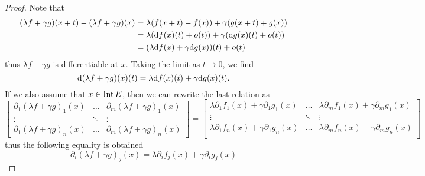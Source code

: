 \begin{proof}
  Note that
  \begin{align*}
    (\lambda f + \gamma g)(x + t) - (\lambda f + \gamma g)(x)
    &= \lambda (f(x + t) - f(x)) + \gamma (g(x + t) + g(x)) \\
    &= \lambda(\mathrm{d} f(x)(t) + o(t)) + \gamma(\mathrm{d} g(x)(t) + o(t)) \\
    &= (\lambda \mathrm{d} f(x) + \gamma \mathrm{d} g(x))(t) + o(t)
  \end{align*}
  thus \(\lambda f + \gamma g\) is differentiable at \(x\). Taking the limit as
  \(t \to 0\), we find
  \[
    \mathrm{d}(\lambda f + \gamma g)(x)(t)
    = \lambda \mathrm{d} f(x)(t) + \gamma \mathrm{d} g(x)(t).
  \]
  If we also assume that \(x \in \operatorname{Int} E\), then we can rewrite the last relation
  as
  \[
    \begin{bmatrix}
      \partial_1 (\lambda f + \gamma g)_1(x) &\dots &\partial_m (\lambda f +
      \gamma g)_1(x) \\
      \vdots &\ddots &\vdots \\
      \partial_1 (\lambda f + \gamma g)_n(x) &\dots &\partial_m(\lambda f +
      \gamma g)_n(x)
    \end{bmatrix}
    =
    \begin{bmatrix}
      \lambda \partial_1 f_1(x) + \gamma \partial_1 g_1(x) &\dots &\lambda
      \partial_m f_1(x) + \gamma \partial_m g_1(x) \\
      \vdots &\ddots &\vdots \\
      \lambda \partial_1 f_n(x) + \gamma \partial_1 g_n(x) &\dots &\lambda
      \partial_m f_n(x) + \gamma \partial_m g_n(x) \\
    \end{bmatrix}
  \]
  thus the following equality is obtained
  \[
    \partial_i (\lambda f + \gamma g)_j(x) = \lambda \partial_i f_j(x) + \gamma
    \partial_i g_j(x)
  \]
\end{proof}

